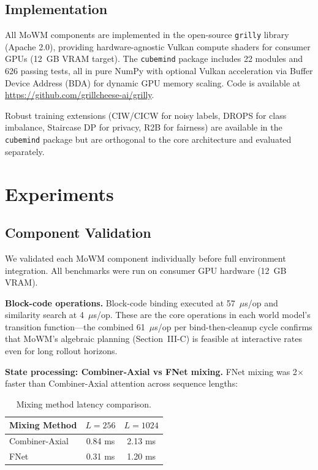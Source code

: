 \documentclass[journal]{IEEEtai}
\begin{document}
\subsection{Implementation}

All MoWM components are implemented in the open-source \texttt{grilly} library (Apache 2.0), providing hardware-agnostic Vulkan compute shaders for consumer GPUs (12~GB VRAM target). The \texttt{cubemind} package includes 22 modules and 626 passing tests, all in pure NumPy with optional Vulkan acceleration via Buffer Device Address (BDA) for dynamic GPU memory scaling. Code is available at \url{https://github.com/grillcheese-ai/grilly}.

Robust training extensions (CIW/CICW for noisy labels, DROPS for class imbalance, Staircase DP for privacy, R2B for fairness) are available in the \texttt{cubemind} package but are orthogonal to the core architecture and evaluated separately.

\section{Experiments}

\subsection{Component Validation}

We validated each MoWM component individually before full environment integration. All benchmarks were run on consumer GPU hardware (12~GB VRAM).

\textbf{Block-code operations.} Block-code binding executed at 57~$\mu$s/op and similarity search at 4~$\mu$s/op. These are the core operations in each world model's transition function---the combined 61~$\mu$s/op per bind-then-cleanup cycle confirms that MoWM's algebraic planning (Section~III-C) is feasible at interactive rates even for long rollout horizons.

\textbf{State processing: Combiner-Axial vs FNet mixing.} FNet mixing was 2$\times$ faster than Combiner-Axial attention across sequence lengths:

\begin{table}[t]
\centering
\caption{Mixing method latency comparison.}
\label{tab:mixing}
\begin{tabular}{lcc}
\toprule
Mixing Method & $L=256$ & $L=1024$ \\
\midrule
Combiner-Axial & 0.84 ms & 2.13 ms \\
FNet & 0.31 ms & 1.20 ms \\
\bottomrule
\end{tabular}
\end{table}
\end{document}
